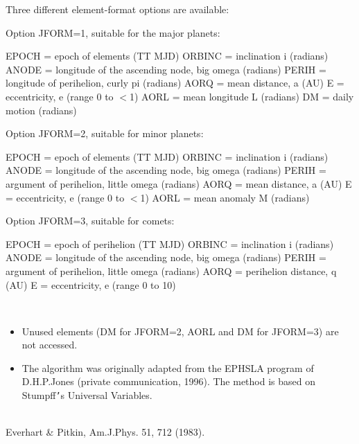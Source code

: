 \documentclass[twoside,11pt]{article}
\renewcommand{\_}{\texttt{\symbol{95}}}
\newcommand{\sstdiytopic}[2]{\item[{\hspace{-0.35em}#1\hspace{-0.35em}:}]
\mbox{} \\[1.3ex] #2}
\newcommand{\sstitemlist}[1]{
  \mbox{} \\
  \vspace{-3.5ex}
  \begin{itemize}
     #1
  \end{itemize}
}
\newcommand{\sstitem}{\item}
\newcommand{\sstdiytopic}[2]{\item[{#1}] #2 }
\newcommand{\sstitemlist}[1]{
      \begin{itemize}
         #1
      \end{itemize}
      \\
   }
\newcommand{\sstitem}{\item}
\begin{document}
{{{         \sstitem
         Three different element-format options are available:

      }
        Option JFORM=1, suitable for the major planets:

        EPOCH  = epoch of elements (TT MJD)
        ORBINC = inclination i (radians)
        ANODE  = longitude of the ascending node, big omega (radians)
        PERIH  = longitude of perihelion, curly pi (radians)
        AORQ   = mean distance, a (AU)
        E      = eccentricity, e (range 0 to $<$1)
        AORL   = mean longitude L (radians)
        DM     = daily motion (radians)

        Option JFORM=2, suitable for minor planets:

        EPOCH  = epoch of elements (TT MJD)
        ORBINC = inclination i (radians)
        ANODE  = longitude of the ascending node, big omega (radians)
        PERIH  = argument of perihelion, little omega (radians)
        AORQ   = mean distance, a (AU)
        E      = eccentricity, e (range 0 to $<$1)
        AORL   = mean anomaly M (radians)

        Option JFORM=3, suitable for comets:

        EPOCH  = epoch of perihelion (TT MJD)
        ORBINC = inclination i (radians)
        ANODE  = longitude of the ascending node, big omega (radians)
        PERIH  = argument of perihelion, little omega (radians)
        AORQ   = perihelion distance, q (AU)
        E      = eccentricity, e (range 0 to 10)

      \sstitemlist{

         \sstitem
         Unused elements (DM for JFORM=2, AORL and DM for JFORM=3) are
           not accessed.

         \sstitem
         The algorithm was originally adapted from the EPHSLA program of
           D.H.P.Jones (private communication, 1996).  The method is based
           on Stumpff{\tt '}s Universal Variables.
      }
   }
   \sstdiytopic{
      See Also
   }{
      Everhart \& Pitkin, Am.J.Phys. 51, 712 (1983).
   }
}
\end{document}
